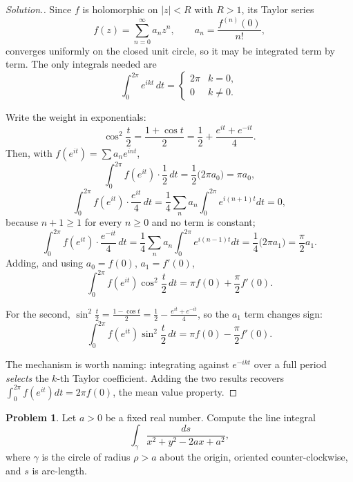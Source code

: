 \documentclass[11pt,a4paper]{article}
\theoremstyle{definition}
\newtheorem{problemx}{Problem}[section]
\newenvironment{problem}{\begin{problemx}}{\end{problemx}}
\newenvironment{solution}
  {\renewcommand{\qedsymbol}{}\begin{proof}[\textit{Solution}.]}
  {\end{proof}}
\begin{document}
\begin{solution}
Since $f$ is holomorphic on $\left|z\right| < R$ with $R > 1$, its Taylor series
$$f(z) = \sum^{\infty}_{n=0} a_n z^{n},\qquad a_n = \frac{f^{(n)}(0)}{n!},$$
converges uniformly on the closed unit circle, so it may be integrated term by
term. The only integrals needed are
$$\int^{2\pi}_{0} e^{ikt}\,dt = \begin{cases} 2\pi & k = 0,\\ 0 & k \neq 0.\end{cases}$$

Write the weight in exponentials:
$$\cos^{2}\frac{t}{2} = \frac{1+\cos t}{2}
= \frac{1}{2} + \frac{e^{it} + e^{-it}}{4}.$$
Then, with $f(e^{it}) = \sum a_n e^{int}$,
$$\int^{2\pi}_{0} f(e^{it})\cdot\frac{1}{2}\,dt = \frac{1}{2}\big(2\pi a_0\big) = \pi a_0,$$
$$\int^{2\pi}_{0} f(e^{it})\cdot\frac{e^{it}}{4}\,dt
= \frac{1}{4}\sum_n a_n\!\int^{2\pi}_{0}\! e^{i(n+1)t}dt = 0,$$
because $n + 1 \geq 1$ for every $n \geq 0$ and no term is constant;
$$\int^{2\pi}_{0} f(e^{it})\cdot\frac{e^{-it}}{4}\,dt
= \frac{1}{4}\sum_n a_n\!\int^{2\pi}_{0}\! e^{i(n-1)t}dt
= \frac{1}{4}\big(2\pi a_1\big) = \frac{\pi}{2}a_1 .$$
Adding, and using $a_0 = f(0)$, $a_1 = f'(0)$,
$$\boxed{\int^{2\pi}_{0} f\!\left(e^{it}\right)\cos^{2}\frac{t}{2}\,dt
= \pi f(0) + \frac{\pi}{2}f'(0).}$$

For the second, $\sin^{2}\frac{t}{2} = \frac{1-\cos t}{2}
= \frac12 - \frac{e^{it}+e^{-it}}{4}$, so the $a_1$ term changes sign:
$$\boxed{\int^{2\pi}_{0} f\!\left(e^{it}\right)\sin^{2}\frac{t}{2}\,dt
= \pi f(0) - \frac{\pi}{2}f'(0).}$$

The mechanism is worth naming: integrating against $e^{-ikt}$ over a full period
\emph{selects} the $k$-th Taylor coefficient. Adding the two results recovers
$\int_0^{2\pi} f(e^{it})dt = 2\pi f(0)$, the mean value property.
\end{solution}


\begin{problem}
Let $a > 0$ be a fixed real number. Compute the line integral
$$\int_{\gamma}\frac{ds}{x^{2} + y^{2} - 2ax + a^{2}},$$
where $\gamma$ is the circle of radius $\rho > a$ about the origin, oriented
counter-clockwise, and $s$ is arc-length.
\end{problem}
\end{document}
